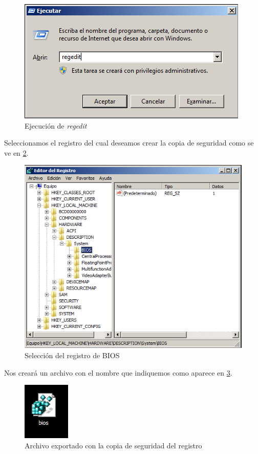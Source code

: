 \begin{figure}[H]
	\centering
	\includegraphics[scale=0.6]{04.png}
	\caption{Ejecución de \textit{regedit}} \label{04}
\end{figure}

Seleccionamos el registro del cual deseamos crear la copia de seguridad como se ve en \ref{05}.

\begin{figure}[H]
	\centering
	\includegraphics[scale=0.6]{05.png}
	\caption{Selección del registro de BIOS} \label{05}
\end{figure}

Nos creará un archivo con el nombre que indiquemos como aparece en \ref{06}.

\begin{figure}[H]
	\centering
	\includegraphics[scale=0.6]{06.png}
	\caption{Archivo exportado con la copia de seguridad del registro} \label{06}
\end{figure}

